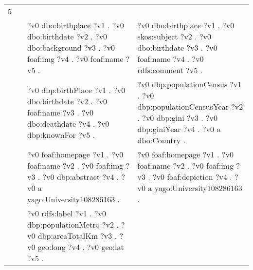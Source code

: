 \begin{table}
{\begin{tabular}{!{\color{white}\vrule}l!{\color{white}\vrule}c@{\hs}!{\color{white}\vrule}p{11.5cm}!{\color{white}\vrule}p{11.5cm}!{\color{white}\vrule}}
			\midrule
			5 & \phantom{a} & \\
			 &  \phantom{a} &     ?v0 dbo:birthplace ?v1 .  ?v0 dbo:birthdate ?v2 .  ?v0 dbo:background ?v3 .  ?v0 foaf:img ?v4 .  ?v0 foaf:name ?v5 . &  ?v0 dbo:birthplace ?v1 .  ?v0 skos:subject ?v2 .  ?v0 dbo:birthdate ?v3 .  ?v0 foaf:name ?v4 .  ?v0 rdfs:comment ?v5 . \\
			 &  \phantom{a} &     ?v0 dbp:birthPlace ?v1 .  ?v0 dbo:birthdate ?v2 .  ?v0 foaf:name ?v3 .  ?v0 dbo:deathdate ?v4 .  ?v0 dbp:knownFor ?v5 . &  ?v0 dbp:populationCensus ?v1 .  ?v0 dbp:populationCensusYear ?v2 .  ?v0 dbp:gini ?v3 .  ?v0 dbp:giniYear ?v4 .  ?v0 a dbo:Country . \\
			 &  \phantom{a} &     ?v0 foaf:homepage ?v1 .  ?v0 foaf:name ?v2 .  ?v0 foaf:img ?v3 .  ?v0 dbp:abstract ?v4 .  ?v0 a yago:University108286163 . &  ?v0 foaf:homepage ?v1 .  ?v0 foaf:name ?v2 .  ?v0 foaf:img ?v3 .  ?v0 foaf:depiction ?v4 .  ?v0 a yago:University108286163 . \\
			 &  \phantom{a} &     ?v0 rdfs:label ?v1 .  ?v0 dbp:populationMetro ?v2 .  ?v0 dbp:areaTotalKm ?v3 .  ?v0 geo:long ?v4 .  ?v0 geo:lat ?v5 . & \\
			

\end{tabular}}
\end{table}
